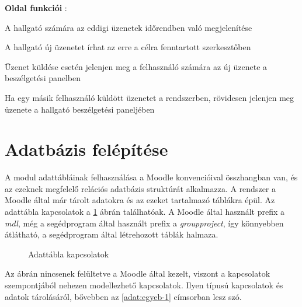 \textbf{Oldal funkciói} :

\begin{compactitem}
	\item  A hallgató számára az eddigi üzenetek időrendben való megjelenítése
    \item A hallgató új üzenetet írhat az erre a célra fenntartott szerkesztőben
    \item Üzenet küldése esetén jelenjen meg a felhasználó számára az új üzenete a beszélgetési panelben
    \item Ha egy másik felhasználó küldött üzenetet a rendszerben, rövidesen jelenjen meg üzenete a hallgató beszélgetési paneljében
 \end{compactitem}

\section{Adatbázis felépítése}

A modul adattábláinak felhasználása a Moodle konvencióival összhangban van, és az ezeknek megfelelő relációs adatbázis struktúrát alkalmazza. A rendszer a Moodle által már tárolt adatokra és az ezeket tartalmazó táblákra épül. Az adattábla kapcsolatok a \ref{fig:example-1} ábrán találhatóak. A Moodle által használt prefix a \textit{mdl}, még a segédprogram által használt prefix a \textit{groupproject}, így könnyebben átlátható, a segédprogram által létrehozott táblák halmaza.

\begin{figure}[H]
	\caption{Adattábla kapcsolatok}
	\label{fig:example-1}
\end{figure}
Az ábrán nincsenek felültetve a Moodle által kezelt, viszont a kapcsolatok szempontjából nehezen modellezhető kapcsolatok. Ilyen típusú kapcsolatok és adatok tárolásáról, bővebben az  \ref{adat:egyeb-1} címsorban lesz szó.

